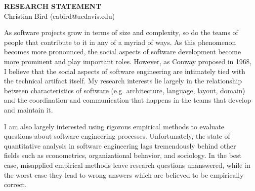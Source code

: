 \documentclass[10pt]{article}
\begin{document}
\thispagestyle{fancy}
\lhead{}
\rhead{}
\renewcommand{\headrulewidth}{0pt} 
\renewcommand{\footrulewidth}{0pt} 
\fancyfoot[C]{\footnotesize \textcolor{gray}{http://wwwcsif.ucdavis.edu/$\sim$bird/index.html}}


\pagestyle{fancy}
\lhead{\textcolor{gray}{\it Christian Bird, Research Statement}}
\rhead{\textcolor{gray}{\thepage/\totalpages{}}}

\begin{small}

\begin{center}
{\LARGE \bf RESEARCH STATEMENT}\\
\vspace*{0.1cm}
{\normalsize Christian Bird (cabird@ucdavis.edu)}
\end{center}



As software projects grow in terms of size and complexity, so do the teams of
people that contribute to it in any of a myriad of ways.  As this phenomenon
becomes more pronounced, the social aspects of software development become more
prominent and play important roles.  However, as Conway proposed in 1968, I
believe that the social aspects of software engineering are intimately tied
with the technical artifact itself.  My research interests lie largely in the
relationship between characteristics of software (e.g. architecture, language,
layout, domain) and the coordination and communication that happens in the
teams that develop and maintain it.

I am also largely interested using rigorous empirical methods to evaluate
questions about software engineering processes.  Unfortunately, the state
of quantitative analysis in software engineering lags tremendously behind
other fields such as econometrics, organizational behavior, and sociology.
In the best case, misapplied empirical methods leave research questions
unanswered, while in the worst case they lead to wrong answers which are believed
to be empirically correct.


\end{small}
\end{document}
